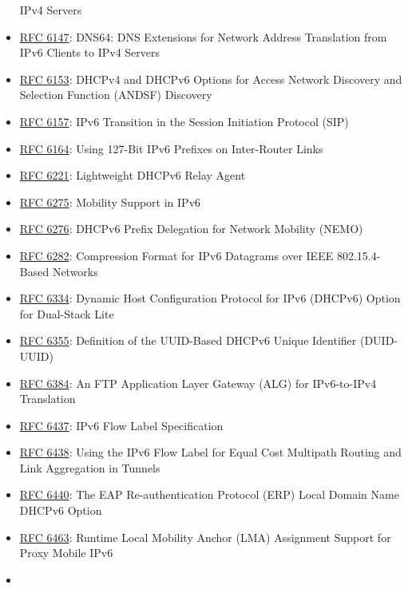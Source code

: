 \documentclass[
]{article}
\begin{document}
\begin{itemize}
  IPv4 Servers
\item
  \href{https://www.rfc-editor.org/info/rfc6147}{RFC 6147}: DNS64: DNS
  Extensions for Network Address Translation from IPv6 Clients to IPv4
  Servers
\item
  \href{https://www.rfc-editor.org/info/rfc6153}{RFC 6153}: DHCPv4 and
  DHCPv6 Options for Access Network Discovery and Selection Function
  (ANDSF) Discovery
\item
  \href{https://www.rfc-editor.org/info/rfc6157}{RFC 6157}: IPv6
  Transition in the Session Initiation Protocol (SIP)
\item
  \href{https://www.rfc-editor.org/info/rfc6164}{RFC 6164}: Using
  127-Bit IPv6 Prefixes on Inter-Router Links
\item
  \href{https://www.rfc-editor.org/info/rfc6221}{RFC 6221}: Lightweight
  DHCPv6 Relay Agent
\item
  \href{https://www.rfc-editor.org/info/rfc6275}{RFC 6275}: Mobility
  Support in IPv6
\item
  \href{https://www.rfc-editor.org/info/rfc6276}{RFC 6276}: DHCPv6
  Prefix Delegation for Network Mobility (NEMO)
\item
  \href{https://www.rfc-editor.org/info/rfc6282}{RFC 6282}: Compression
  Format for IPv6 Datagrams over IEEE 802.15.4-Based Networks
\item
  \href{https://www.rfc-editor.org/info/rfc6334}{RFC 6334}: Dynamic Host
  Configuration Protocol for IPv6 (DHCPv6) Option for Dual-Stack Lite
\item
  \href{https://www.rfc-editor.org/info/rfc6355}{RFC 6355}: Definition
  of the UUID-Based DHCPv6 Unique Identifier (DUID-UUID)
\item
  \href{https://www.rfc-editor.org/info/rfc6384}{RFC 6384}: An FTP
  Application Layer Gateway (ALG) for IPv6-to-IPv4 Translation
\item
  \href{https://www.rfc-editor.org/info/rfc6437}{RFC 6437}: IPv6 Flow
  Label Specification
\item
  \href{https://www.rfc-editor.org/info/rfc6438}{RFC 6438}: Using the
  IPv6 Flow Label for Equal Cost Multipath Routing and Link Aggregation
  in Tunnels
\item
  \href{https://www.rfc-editor.org/info/rfc6440}{RFC 6440}: The EAP
  Re-authentication Protocol (ERP) Local Domain Name DHCPv6 Option
\item
  \href{https://www.rfc-editor.org/info/rfc6463}{RFC 6463}: Runtime
  Local Mobility Anchor (LMA) Assignment Support for Proxy Mobile IPv6
\item

\end{itemize}
\end{document}
